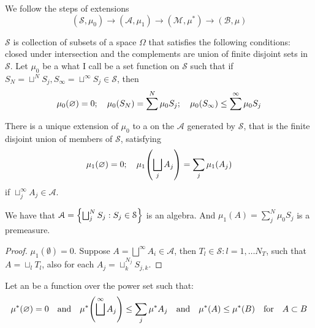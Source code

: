 
We follow the steps of extensions
\begin{equation*}
    (\mathcal{S}, \mu_{0}) \to (\mathcal{A}, \mu_{1}) \to (\mathcal{M}, \mu^{*}) \to (\mathcal{B}, \mu)
\end{equation*}

 \(\mathcal{S}\) is collection of subsets of a space \(\Omega\) that satisfies the following conditions: closed under intersection and the complements are union of finite disjoint sets in \(\mathcal{S}\). Let \(\mu_{0}\) be a what I call  be a set function on \(\mathcal{S}\) such that if \(S_{N} = \sqcup^{N}S_{j}, S_{\infty} = \sqcup^{\infty}S_{j} \in \mathcal{S}\), then
\begin{equation*}
    \mu_{0}(\emptyset) = 0 ; \quad \mu_{0}\pqty{S_{N}} = \sum^{N} \mu_{0}S_{j}; \quad  \mu_{0}\pqty{S_{\infty}} \leq \sum^{\infty} \mu_{0}S_{j}
\end{equation*} 

There is a unique extension of \(\mu_{0}\) to a  on the  \(\mathcal{A}\) generated by \(\mathcal{S}\), that is the finite disjoint union of members of \(\mathcal{S}\), satisfying 
\begin{equation*}
    \mu_{1}\pqty{\emptyset} = 0; \quad \mu_{1}\pqty{\sqcup_{j} A_{j}} = \sum_{j} \mu_{1}\pqty{A_{j}}
\end{equation*}
if \(\sqcup_{j}^{\infty} A_{j} \in \mathcal{A}\). 



\begin{thm}
    We have that \(\mathcal{A} = \Bqty{\bigsqcup^{N}_{j} S_{j} : S_{j} \in \mathcal{S}}\) is an algebra. And \(\mu_{1}(A) = \sum^{N}_{j} \mu_{0} S_{j}\) is a premeasure. 
\end{thm}

\begin{proof}
    \(\mu_{1}(\emptyset) = 0\). Suppose \(A = \bigsqcup^{\infty} A_{i} \in \mathcal{A}\), then  \(T_{l}\in \mathcal{S}: l = 1,\dots N_T\), such that \(A = \sqcup_{l} T_{l}\), also for each \(A_{j} = \sqcup^{N_{j}}_{k} S_{j,k}\). 
\end{proof}

Let an  be a function over the power set such that:
\begin{equation*}
    \mu^{*}(\emptyset)= 0 \qq{and} \mu^{*}\pqty{\sqcup^{\infty} A_{j}}\leq \sum_{j} \mu^{*} A_{j} \qq{and} \mu^{*}(A) \leq \mu^{*}(B)  \qq{for} A \subset B
\end{equation*}

